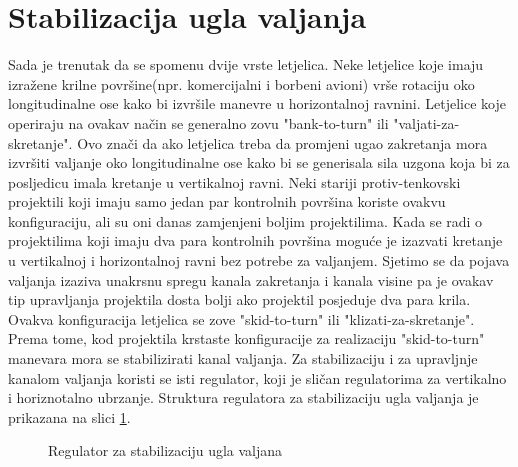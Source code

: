 \section{Stabilizacija ugla valjanja}
Sada je trenutak da se spomenu dvije vrste letjelica. Neke letjelice koje imaju izražene 
krilne površine(npr. komercijalni i borbeni avioni) vrše rotaciju oko longitudinalne ose kako 
bi izvršile manevre u horizontalnoj ravnini. Letjelice koje operiraju na ovakav način se 
generalno zovu "bank-to-turn" ili "valjati-za-skretanje". Ovo znači da ako letjelica 
treba da promjeni ugao zakretanja mora izvršiti valjanje oko longitudinalne ose kako bi se 
generisala sila uzgona koja bi za posljedicu imala kretanje u vertikalnoj ravni. Neki stariji 
protiv-tenkovski projektili koji imaju samo jedan par kontrolnih površina koriste ovakvu konfiguraciju, ali 
su oni danas zamjenjeni boljim projektilima. Kada se radi o projektilima koji imaju dva para kontrolnih površina 
moguće je izazvati kretanje u vertikalnoj i horizontalnoj ravni bez potrebe za valjanjem. Sjetimo se da 
pojava valjanja izaziva unakrsnu spregu kanala zakretanja i kanala visine pa je ovakav tip upravljanja projektila dosta 
bolji ako projektil posjeduje dva para krila. Ovakva konfiguracija letjelica se zove "skid-to-turn" ili "klizati-za-skretanje". 
Prema tome, kod projektila krstaste konfiguracije za realizaciju "skid-to-turn" manevara mora se stabilizirati kanal valjanja. 
Za stabilizaciju i za upravljnje kanalom valjanja koristi se isti regulator, koji je sličan regulatorima za vertikalno i 
horiznotalno ubrzanje. Struktura regulatora za stabilizaciju ugla valjanja je prikazana na slici \ref{fig:rollStab}.
\begin{figure}[!ht]
    \centering
    \caption{Regulator za stabilizaciju ugla valjana}
    \label{fig:rollStab}
\end{figure}
